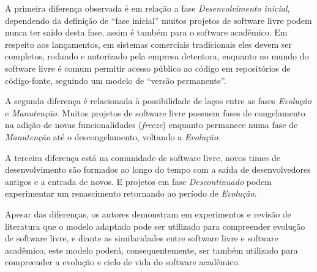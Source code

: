 A primeira diferença observada é em relação a fase {\it Desenvolvimento inicial},
dependendo da definição de ``fase inicial'' muitos projetos de software livre
podem nunca ter saído desta fase, assim é também para o software acadêmico. Em respeito aos lançamentos,
em sistemas comerciais tradicionais eles devem ser completos, rodando e autorizado
pela empresa detentora, enquanto no mundo do software livre é comum
permitir acesso público ao código em repositórios de código-fonte, seguindo
um modelo de ``versão permanente''.

A segunda diferença é relacionada à possibilidade de laços entre
as fases {\it Evolução} e {\it Manutenção}. Muitos projetos de software livre
possuem fases de congelamento na adição de novas funcionalidades ({\it freeze})
enquanto permanece numa fase de {\it Manutenção} até o descongelamento, voltando
a {\it Evolução}.

A terceira diferença está na comunidade de software livre,
novos times de desenvolvimento são formados ao longo do tempo
com a saída de desenvolvedores antigos e a entrada de novos.
E projetos em fase {\it Descontinuado} podem experimentar um renascimento
retornando ao período de {\it Evolução}.

Apesar das diferenças, os autores  demonstram em experimentos e
revisão de literatura que o modelo adaptado pode ser utilizado para
compreender evolução de software livre, e diante as similaridades entre software livre
e software acadêmico, este modelo poderá, consequentemente, ser também
utilizado para compreender a evolução e ciclo de vida do software acadêmico.
